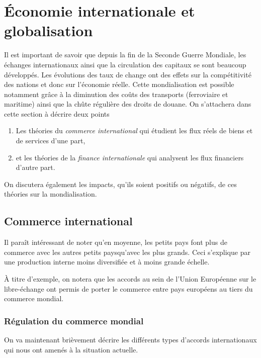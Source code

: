 \section{Économie internationale et globalisation} %
\label{sec:economie_internationale_et_globalisation}

Il est important de savoir que depuis la fin de la Seconde Guerre Mondiale,
les échanges internationaux ainsi que la circulation des capitaux se
sont beaucoup développés.
Les évolutions des taux de change ont des effets sur la compétitivité
des nations et donc sur l'économie réelle.
Cette mondialisation est possible notamment grâce à la diminution
des coûts des transports (ferroviaire et maritime)
ainsi que la chûte régulière des droits de douane.
On s'attachera dans cette section à décrire deux points
\begin{enumerate}
  \item Les théories du \emph{commerce international} qui étudient les flux réels de biens 
  et de services d'une part,
  \item et les théories de la \emph{finance internationale} qui analysent les flux 
  financiers d'autre part.
\end{enumerate}
On discutera également les impacts, qu'ils soient positifs ou négatifs,
de ces théories sur la mondialisation.

\subsection{Commerce international} %
\label{sub:commerce_international}
Il paraît intéressant de noter qu'en moyenne, les petits pays font plus 
de commerce avec les autres petits paysqu'avec les plus grands.
Ceci s'explique par une production interne moins diversifiée
et à moins grande échelle.

À titre d'exemple, on notera que les accords au sein de l'Union Européenne
sur le libre-échange ont permis de porter le commerce entre pays européens au tiers
du commerce mondial.


\subsubsection{Régulation du commerce mondial} %
\label{ssub:regulation_du_commerce_mondial}
On va maintenant brièvement décrire les différents types d'accords internationaux
qui nous ont amenés à la situation actuelle.

